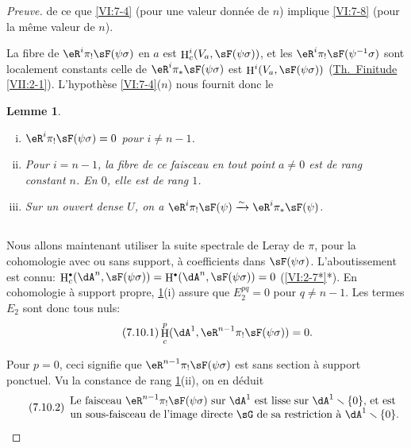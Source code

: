 \documentclass[oneside]{book}
\DeclareMathOperator{\h}{H}
\newcommand{\iso}{\xrightarrow\sim}
\renewcommand{\setminus}{\smallsetminus}
\theoremstyle{sga-source}
\theoremstyle{sga-source-dash}
\theoremstyle{sga-source-dotdash}
\theoremstyle{sga-source-number-note-dash}
\theoremstyle{sga-source-note-number-dotdash}
\theoremstyle{sga-source-example-dotdash}
\theoremstyle{sga-source-inline-number}
\theoremstyle{sga-source-bare-number}
\theoremstyle{sga-source}
\newtheorem{lemma_}[subsection]{Lemme}
\let\oldbullet\bullet
\renewcommand{\bullet}{\textnormal{\tiny$\oldbullet$}}
\begin{document}
\begin{proof}[Preuve]
de ce que \ref{VI:7-4} (pour une valeur donnée de $n$) implique \ref{VI:7-8} 
(pour la même valeur de $n$). 

La fibre de $\eR^i \pi_! \sF(\psi\sigma)$ en $a$ est 
$\h_c^i(V_a,\sF(\psi\sigma))$, et  les 
$\eR^i \pi_!\sF(\psi^{-1}\sigma)$ sont localement constants celle de 
$\eR^i \pi_\ast \sF(\psi\sigma)$ est $\h^i(V_a,\sF(\psi\sigma))$ 
(\hyperref[VII]{Th.\ Finitude} \ref{VII:2-1}). L'hypothèse \ref{VI:7-4}($n$) 
nous fournit donc le 





\begin{lemma_}\label{VI:7-9}
\begin{enumerate}[(i)]
  \item $\eR^i \pi_! \sF(\psi\sigma)=0$ pour $i\ne n-1$. 
  \item Pour $i=n-1$, la fibre de ce faisceau en tout point $a\ne 0$ est de rang 
    constant $n$. En $0$, elle est de rang $1$. 
  \item Sur un ouvert dense $U$, on a 
    $\eR^i \pi_! \sF(\psi) \iso \eR^i \pi_\ast \sF(\psi)$. 
\end{enumerate}
\end{lemma_}





\subsection{}\label{VI:7-10}

Nous allons maintenant utiliser la suite spectrale de Leray de $\pi$, pour la 
cohomologie avec ou sans support, à coefficients dans $\sF(\psi\sigma)$. 
L'aboutissement est connu: 
$\h_c^\bullet(\dA^n,\sF(\psi\sigma))=\h^\bullet(\dA^n,\sF(\psi\sigma)) = 0$ 
(\ref{VI:2-7*}*). En cohomologie à support propre, \ref{VI:7-9}(i) assure que 
$E_2^{pq}=0$ pour $q\ne n-1$. Les termes $E_2$ sont donc tous nuls: 
\begin{equation*}\tag{7.10.1}\label{VI:eq:7-10-1}
  \h_c^p(\dA^1,\eR^{n-1} \pi_!\sF(\psi\sigma)) = 0 \text{.} 
\end{equation*}

Pour $p=0$, ceci signifie que $\eR^{n-1}\pi_! \sF(\psi\sigma)$ est sans section 
à support ponctuel. Vu la constance de rang \ref{VI:7-9}(ii), on en déduit 
\begin{equation*}\tag{7.10.2}\label{VI:eq:7-10-2}
  \begin{array}{c}
    \text{Le faisceau $\eR^{n-1} \pi_! \sF(\psi\sigma)$ sur $\dA^1$ est lisse sur $\dA^1\setminus \{0\}$, et est } \\ 
    \text{un sous-faisceau de l'image directe $\sG$ de sa restriction à $\dA^1\setminus \{0\}$.}
  \end{array}
\end{equation*}


\end{proof}
\end{document}
